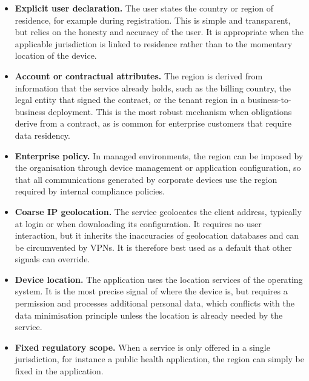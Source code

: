 \begin{itemize}
    \item \textbf{Explicit user declaration.} The user states the country or region of residence, for example during registration. This is simple and transparent, but relies on the honesty and accuracy of the user. It is appropriate when the applicable jurisdiction is linked to residence rather than to the momentary location of the device.

    \item \textbf{Account or contractual attributes.} The region is derived from information that the service already holds, such as the billing country, the legal entity that signed the contract, or the tenant region in a business-to-business deployment. This is the most robust mechanism when obligations derive from a contract, as is common for enterprise customers that require data residency.

    \item \textbf{Enterprise policy.} In managed environments, the region can be imposed by the organisation through device management or application configuration, so that all communications generated by corporate devices use the region required by internal compliance policies.

    \item \textbf{Coarse IP geolocation.} The service geolocates the client address, typically at login or when downloading its configuration. It requires no user interaction, but it inherits the inaccuracies of geolocation databases \cite{Poese2011IPUnreliable, Cozar2022ReliabilityTransfers} and can be circumvented by VPNs. It is therefore best used as a default that other signals can override.

    \item \textbf{Device location.} The application uses the location services of the operating system. It is the most precise signal of where the device is, but requires a permission and processes additional personal data, which conflicts with the data minimisation principle unless the location is already needed by the service.

    \item \textbf{Fixed regulatory scope.} When a service is only offered in a single jurisdiction, for instance a public health application, the region can simply be fixed in the application.
\end{itemize}


